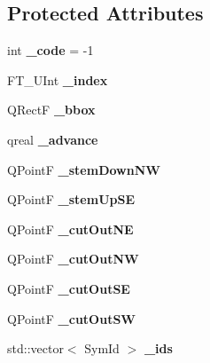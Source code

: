 \subsection*{Protected Attributes}
\begin{DoxyCompactItemize}
\item 
\mbox{\label{class_ms_1_1_sym_ae2d2f2af5c4be7f35700a93cbfd1f375}} 
int {\bfseries \+\_\+code} = -\/1
\item 
\mbox{\label{class_ms_1_1_sym_a425f4b8b5d2e5778b6b73efa4f3f529f}} 
F\+T\+\_\+\+U\+Int {\bfseries \+\_\+index}
\item 
\mbox{\label{class_ms_1_1_sym_a03763b48a1c0606c5bd52b6549183021}} 
Q\+RectF {\bfseries \+\_\+bbox}
\item 
\mbox{\label{class_ms_1_1_sym_a00c37996f386d453e5e2f8fc2d0f9b7f}} 
qreal {\bfseries \+\_\+advance}
\item 
\mbox{\label{class_ms_1_1_sym_af86e24ede3a02428478b8850e5eed7ad}} 
Q\+PointF {\bfseries \+\_\+stem\+Down\+NW}
\item 
\mbox{\label{class_ms_1_1_sym_a6365fabc41194b68c0b658fa9c1ad025}} 
Q\+PointF {\bfseries \+\_\+stem\+Up\+SE}
\item 
\mbox{\label{class_ms_1_1_sym_a310cba4955cdab2ccecc6309c647ebb7}} 
Q\+PointF {\bfseries \+\_\+cut\+Out\+NE}
\item 
\mbox{\label{class_ms_1_1_sym_a26ad4f03de7b56ecbdd7c52e02b8909b}} 
Q\+PointF {\bfseries \+\_\+cut\+Out\+NW}
\item 
\mbox{\label{class_ms_1_1_sym_a7d699fec55add170d565835d01e16740}} 
Q\+PointF {\bfseries \+\_\+cut\+Out\+SE}
\item 
\mbox{\label{class_ms_1_1_sym_ae1dedb86e4c6be44b9d907418bc6d67a}} 
Q\+PointF {\bfseries \+\_\+cut\+Out\+SW}
\item 
\mbox{\label{class_ms_1_1_sym_aca7d1c79f97135292e17fc3903e28017}} 
std\+::vector$<$ Sym\+Id $>$ {\bfseries \+\_\+ids}
\end{DoxyCompactItemize}
